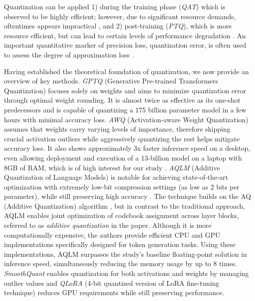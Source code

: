 \documentclass[conference]{IEEEtran}
\begin{document}
Quantization can be applied 1) during the training phase (\textit{QAT}) which is observed to be highly efficient; however, due to significant resource demands, oftentimes appears impractical \cite{chen2024EfficientQAT}, and 2) post-training (\textit{PTQ}), which is more resource efficient, but can lead to certain levels of performance degradation \cite{shen2024exploring}. An important quantitative marker of precision loss, quantization error, is often used to assess the degree of approximation loss \cite{lin2024AWQ}.

Having established the theoretical foundation of quantization, we now provide an overview of key methods. \textit{GPTQ} (Generative Pre-trained Transformers Quantization) focuses solely on weights and aims to minimize quantization error through optimal weight rounding. It is almost twice as effective as its one-shot predecessors and is capable of quantizing a 175 billion parameter model in a few hours with minimal accuracy loss\cite{frantar2023GPTQ}. \textit{AWQ} (Activation-aware Weight Quantization) assumes that weights carry varying levels of importance, therefore skipping crucial activation outliers while aggressively quantizing the rest helps mitigate accuracy loss. It also shows approximately 3x faster inference speed on a desktop, even allowing deployment and execution of a 13-billion model on a laptop with 8GB of RAM, which is of high interest for our study \cite{lin2024AWQ}. \textit{AQLM} (Additive Quantization of Language Models) is notable for achieving state-of-the-art optimization with extremely low-bit compression settings (as low as 2 bits per parameter), while still preserving high accuracy \cite{egiazarian2024AQLM}. The technique builds on the AQ (Additive Quantization) algorithm \cite{babenko2014additive}, but in contrast to the traditional approach, AQLM enables joint optimization of codebook assignment across layer blocks, referred to as \textit{additive quantization} in the paper. Although it is more computationally expensive, the authors provide efficient CPU and GPU implementations specifically designed for token generation tasks. Using these implementations, AQLM surpasses the study's baseline floating-point solution in inference speed, simultaneously reducing the memory usage by up to 8 times. \textit{SmoothQuant} \cite{xiao2023SmoothQuant} enables quantization for both activations and weights by managing outlier values and \textit{QLoRA} (4-bit quantized version of LoRA fine-tuning technique) \cite{dettmers2023qlora} reduces GPU requirements while still preserving performance.
\end{document}
